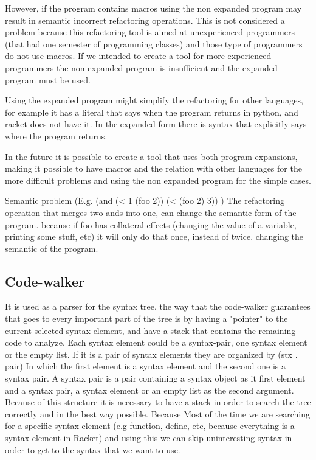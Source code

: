 However, if the program contains macros using the non expanded program may
result in semantic incorrect refactoring operations. This is not considered a
problem because this refactoring tool is aimed at unexperienced programmers (that
had one semester of programming classes) and those type of programmers do not use
macros. If we intended to create a tool for more experienced programmers the non
expanded program is insufficient and the expanded program must be used.


Using the expanded program might simplify the refactoring for other languages,
for example it has a literal that says when the program returns in python, and
racket does not have it. In the expanded form there is syntax that explicitly says
where the program returns.

In the future it is possible to create a tool that uses both program expansions,
making it possible to have macros and the relation with other languages for the
more difficult problems and using the non expanded program for the simple cases.

Semantic problem (E.g. (and (< 1 (foo 2)) (< (foo 2) 3)) )
The refactoring operation that merges two ands into one, can change the semantic
form of the program. because if foo has collateral effects (changing the value of
a variable, printing some stuff, etc) it will only do that once, instead of twice.
changing the semantic of the program.

\subsection{Code-walker} %
It is used as a parser for the syntax tree.
the way that the code-walker guarantees that goes to every important part of the
tree is by having a "pointer" to the current selected syntax element, and have
a stack that contains the remaining code to analyze.
Each syntax element could be a syntax-pair, one syntax element or the empty list.
If it is a pair of syntax elements they are organized by (stx . pair)
In which the first element is a syntax element and the second one is a syntax pair.
A syntax pair is a pair containing a syntax object as it first element and
a syntax pair, a syntax element or an empty list as the second argument.
Because of this structure it is necessary to have a stack in order to search
the tree correctly and in the best way possible.
Because Most of the time we are searching for a specific syntax element (e.g function,
define, etc, because everything is a syntax element in Racket) and using this we
can skip uninteresting syntax in order to get to the syntax that we want to use.


